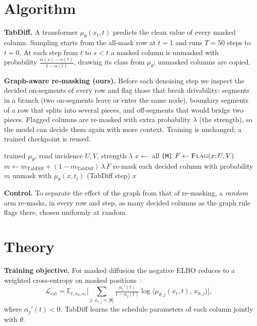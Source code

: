 \documentclass[10pt,twocolumn,a4paper]{article}
\newcommand{\M}{\texttt{[M]}}
\begin{document}
\section{Algorithm}
\label{sec:d}
\textbf{TabDiff.} A transformer $\mu_\theta(x_t,t)$ predicts the clean value of every masked column.
Sampling starts from the all-mask row at $t=1$ and runs $T=50$ steps to $t=0$. At each step from $t$ to
$s<t$ a masked column is unmasked with probability $\frac{\alpha(s)-\alpha(t)}{1-\alpha(t)}$, drawing its
class from $\mu_\theta$; unmasked columns are copied.

\textbf{Graph-aware re-masking (ours).} Before each denoising step we inspect the decided on-segments of
every row and flag those that break drivability: segments in a branch (two on-segments leave or enter
the same node), boundary segments of a row that splits into several pieces, and off-segments that would
bridge two pieces. Flagged columns are re-masked with extra probability $\lambda$ (the strength), so the
model can decide them again with more context. Training is unchanged; a trained checkpoint is reused.

\begin{algorithm}[t]
\caption{Graph-aware re-masking sampler}\label{alg:gs}
\small
\begin{algorithmic}[1]
\Require trained $\mu_\theta$, road incidence $U,V$, strength $\lambda$
\State $x \gets$ all \M
{}
  \State $F \gets \textsc{Flag}(x;U,V)$ 
  \State $m \gets m_{\text{TabDiff}} + (1-m_{\text{TabDiff}})\,\lambda\,F$
  \State re-mask each decided column with probability $m$
  \State unmask with $\mu_\theta(x,t_i)$ (TabDiff step)
\EndFor
\State \Return $x$
\end{algorithmic}
\end{algorithm}

\textbf{Control.} To separate the effect of the graph from that of re-masking, a \emph{random} arm
re-masks, in every row and step, as many decided columns as the graph rule flags there, chosen
uniformly at random.

\section{Theory}
\label{sec:e}
\textbf{Training objective.} For masked diffusion the negative ELBO reduces to a weighted cross-entropy on
masked positions~\cite{tabdiff}:
\begin{equation}
\mathcal{L}_{\text{cat}} = \mathbb{E}_{t,x_0,x_t}\Big[\sum_{j:\,x_{t,j}=\M}
\tfrac{\alpha_j'(t)}{1-\alpha_j(t)}\log \langle \mu_{\theta,j}(x_t,t),\,x_{0,j}\rangle\Big],
\end{equation}
where $\alpha_j'(t)<0$. TabDiff learns the schedule parameters of each column jointly with $\theta$.
\end{document}
